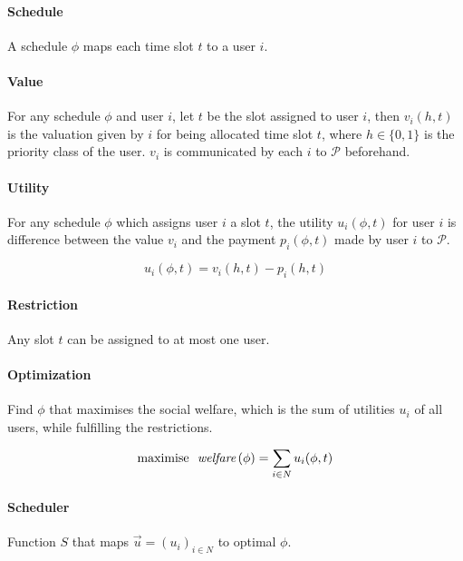 \paragraph{Schedule} A schedule $\phi$ maps each time slot $t$ to a user $i$.

\paragraph{Value} For any schedule $\phi$ and user $i$, let $t$ be the
slot assigned to user $i$, then 
$v_i(h, t)$ is the valuation given by $i$
for being allocated time slot $t$,
where $h \in \{0, 1\}$ is the priority class of the user.
$v_i$ is communicated by each $i$ to $\mathcal{P}$ beforehand.

\paragraph{Utility} For any schedule $\phi$ which assigns user $i$ a slot $t$, the utility $u_i(\phi, t)$ for user $i$ is difference between the value $v_i$ and the payment $p_i(\phi, t)$ made by user $i$ to $\mathcal{P}$.

\begin{equation}
	u_i(\phi, t) = v_i(h, t) - p_i(h, t)
\end{equation}

\paragraph{Restriction} Any slot $t$ can be assigned to at most one user.

\paragraph{Optimization} Find $\phi$ that maximises the social welfare, which is the sum of utilities $u_i$ of all users, while fulfilling the restrictions.

\begin{equation}
	\text{maximise} \ \ \textrm{\itshape welfare}\, (\phi) = \sum_{i \in N} u_i(\phi,t) %
\end{equation}

\paragraph{Scheduler} Function $S$ that maps $\vec{u} = (u_i)_{i \in N}$ to optimal $\phi$.

